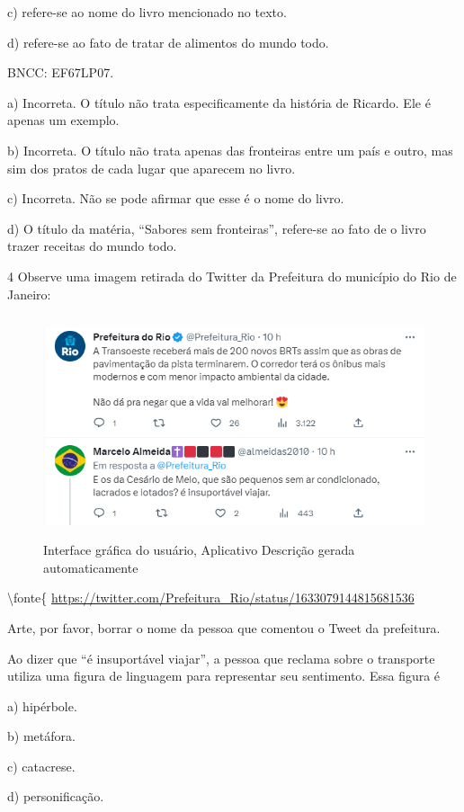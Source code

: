 c) refere-se ao nome do livro mencionado no texto.

d) refere-se ao fato de tratar de alimentos do mundo todo.

BNCC: EF67LP07.

a) Incorreta. O título não trata especificamente da história de Ricardo.
Ele é apenas um exemplo.

b) Incorreta. O título não trata apenas das fronteiras entre um país e
outro, mas sim dos pratos de cada lugar que aparecem no livro.

c) Incorreta. Não se pode afirmar que esse é o nome do livro.

d) O título da matéria, ``Sabores sem fronteiras'', refere-se ao fato de
o livro trazer receitas do mundo todo.

\num{4} Observe uma imagem retirada do Twitter da Prefeitura do
município do Rio de Janeiro:

\begin{figure}
\centering
\includegraphics[width=4.97543in,height=2.56689in]{./imgSAEB_6_POR/media/image6.png}
\caption{Interface gráfica do usuário, Aplicativo Descrição gerada
automaticamente}
\end{figure}

\textbackslash fonte\{
\href{https://twitter.com/Prefeitura_Rio/status/1633079144815681536}{{https://twitter.com/Prefeitura\_Rio/status/1633079144815681536}}

Arte, por favor, borrar o nome da pessoa que comentou o Tweet da
prefeitura.

Ao dizer que ``é insuportável viajar'', a pessoa que reclama sobre o
transporte utiliza uma figura de linguagem para representar seu
sentimento. Essa figura é

a) hipérbole.

b) metáfora.

c) catacrese.

d) personificação.

